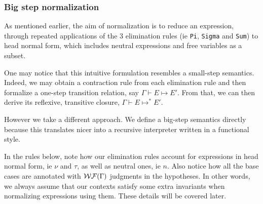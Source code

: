 \documentclass{article}
\begin{document}
\subsubsection{Big step normalization}

As mentioned earlier, the aim of normalization is to reduce an
expression, through repeated applications of the 3 elimination rules
(ie \verb|Pi|, \verb|Sigma| and \verb|Sum|) to head normal form, which includes
neutral expressions and free variables as a subset.

One may notice that this intuitive formulation resembles a small-step semantics.
Indeed, we may obtain a contraction rule from each elimination rule and then
formalize a one-step transition relation, say $\Gamma \vdash E \longmapsto E'$.
From that, we can then derive its reflexive, transitive closure,
$\Gamma \vdash E \longmapsto^* E'$.

However we take a different approach. We define a big-step semantics
directly because this translates nicer into a recursive interpreter written in a
functional style.

In the rules below, note how our elimination rules account for expressions
in head normal form, ie $\nu$ and $\tau$, as well as neutral ones, ie $n$.
Also notice how all the base cases are annotated with $\operatorname{\mathcal{WF}}(\Gamma)$ judgments
in the hypotheses. In other words, we always assume that our contexts satisfy 
some extra invariants when normalizing expressions using them. These details will
be covered later.


\end{document}
